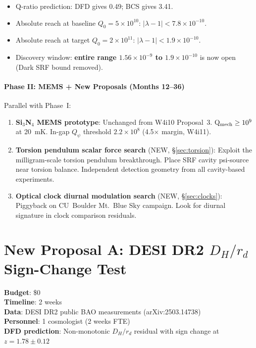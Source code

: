\documentclass[11pt]{article}
\newcommand{\ee}[1]{\times 10^{#1}}
\newcommand{\lbone}{|\lambda - 1|}
\newcommand{\Qpsi}{Q_\psi}
\begin{document}
\begin{itemize}[nosep]
\item Q-ratio prediction: DFD gives 0.49; BCS gives 3.41.
\item Absolute reach at baseline $Q_0 = 5\ee{10}$: $\lbone < 7.8\ee{-10}$.
\item Absolute reach at target $Q_0 = 2\ee{11}$: $\lbone < 1.9\ee{-10}$.
\item Discovery window: \textbf{entire range $1.56\ee{-9}$ to $1.9\ee{-10}$}
  is now open (Dark SRF bound removed).
\end{itemize}

\subsection{Phase II: MEMS + New Proposals (Months 12--36)}

Parallel with Phase~I:

\begin{enumerate}[label=\textbf{II\alph*:}]
\item \textbf{Si$_3$N$_4$ MEMS prototype}: Unchanged from W4i10
  Proposal~3. Q$_{\rm mech} \geq 10^9$ at 20~mK. In-gap
  $\Qpsi$ threshold $2.2\ee{8}$ (4.5$\times$ margin, W4i11).

\item \textbf{Torsion pendulum scalar force search} (NEW, \S\ref{sec:torsion}):
  Exploit the milligram-scale torsion pendulum breakthrough. Place SRF
  cavity psi-source near torsion balance. Independent detection
  geometry from all cavity-based experiments.

\item \textbf{Optical clock diurnal modulation search} (NEW,
  \S\ref{sec:clocks}): Piggyback on CU~Boulder Mt.~Blue Sky campaign.
  Look for diurnal signature in clock comparison residuals.
\end{enumerate}


\part{New Proposal A: DESI DR2 $D_H/r_d$ Sign-Change Test}
\label{part:desi}

\begin{tcolorbox}[colback=purple!3!white, colframe=newcolor,
  title=\textbf{NEW PROPOSAL A --- DESI DR2 $D_H/r_d$ SIGN-CHANGE TEST}]
\textbf{Budget}: \$0\\
\textbf{Timeline}: 2 weeks\\
\textbf{Data}: DESI DR2 public BAO measurements (arXiv:2503.14738)\\
\textbf{Personnel}: 1 cosmologist (2 weeks FTE)\\
\textbf{DFD prediction}: Non-monotonic $D_H/r_d$ residual with sign
change at $z = 1.78 \pm 0.12$
\end{tcolorbox}
\end{document}
